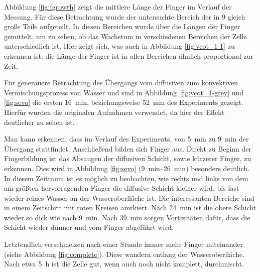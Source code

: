 
Abbildung \ref{fig:fgrowth} zeigt die mittlere Länge der Finger im Verlauf der Messung. Für diese Betrachtung wurde der untersuchte Bereich der \HSC in 9 gleich große Teile aufgeteilt. In diesen Bereichen wurde über die Längen der Finger gemittelt, um zu sehen, ob das Wachstum in verschiedenen Bereichen der Zelle unterschiedlich ist. 
Hier zeigt sich, was auch in Abbildung \ref{fig:vcot_1-1} zu erkennen ist: die Länge der Finger ist in allen Bereichen ähnlich proportional zur Zeit.

Für generauere Betrachtung des Übergangs vom diffusiven zum konvektiven Vermischungsprozess von Wasser und \COT sind in Abbildung \ref{fig:vcot_1-grey} und \ref{fig:sevo} die ersten \SI{16}{\minute}, beziehungsweise \SI{52}{\minute} des Experiments gezeigt. Hierfür wurden die originalen Aufnahmen verwendet, da hier der Effekt deutlicher zu sehen ist.

Man kann erkennen, dass im Verlauf des Experiments, von \SI{5}{\minute} zu \SI{9}{\minute} der Übergang stattfindet. Anschließend bilden sich Finger aus. Direkt zu Beginn der Fingerbildung ist das Absaugen der diffusiven Schicht, sowie kürzerer Finger, zu erkennen. Dies wird in Abbildung \ref{fig:sevo} (\SIrange{9}{26}{\minute}) besonders deutlich. In diesem Zeitraum ist es möglich zu beobachten, wie rechts und links von dem am größten hervorragenden Finger die diffusive Schicht kleiner wird, bis fast wieder reines Wasser an der Wasseroberfläche ist. Die interessanten Bereiche sind in einem Zeitschrit mit roten Kreisen amrkiert. Nach \SI{24}{\minute} ist die obere \COT Schicht wieder so dick wie nach \SI{9}{\minute}. Nach \SI{39}{\minute} sorgen Vortizitäten dafür, dass die Schicht wieder dünner und vom Finger abgeführt wird.

Letztendlich verschmelzen nach einer Stunde immer mehr Finger miteinander (siehe \zB Abbildung \ref{fig:complete}). Diese wandern entlang der Wasseroberfläche.
Nach etwa \SI{5}{\hour} ist die Zelle gut, wenn auch noch nicht komplett, durchmischt.


